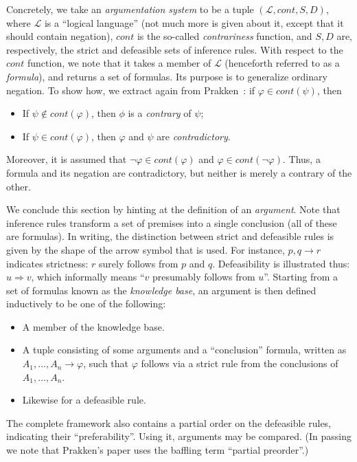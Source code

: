 \documentclass[12pt, a4paper]{article}
\begin{document}
Concretely, we take an \emph{argumentation system} to be a tuple \( (\mathcal{L}, \mathit{cont}, S, D) \), where $\mathcal{L}$ is a ``logical language'' (not much more is given about it, except that it should contain negation), $\mathit{cont}$ is the so-called \emph{contrariness} function, and $S, D$ are, respectively, the strict and defeasible sets of inference rules. With respect to the $cont$ function, we note that it takes a member of $\mathcal{L}$ (henceforth referred to as a \emph{formula}), and returns a set of formulas. Its purpose is to generalize ordinary negation. To show how, we extract again from Prakken~\cite[page 97]{prakken}: if \( \varphi \in \mathit{cont}(\psi) \), then
\begin{itemize}
\item If \( \psi \not\in \mathit{cont}(\varphi) \), then $\phi$ is a \emph{contrary} of $\psi$;
\item If \( \psi \in \mathit{cont}(\varphi) \), then $\varphi$ and $\psi$ are \emph{contradictory}.
\end{itemize}
Moreover, it is assumed that \( \neg\varphi \in \mathit{cont}(\varphi) \) and \( \varphi \in \mathit{cont}(\neg\varphi) \). Thus, a formula and its negation are contradictory, but neither is merely a contrary of the other.

We conclude this section by hinting at the definition of an \emph{argument}. Note that inference rules transform a set of premises into a single conclusion (all of these are formulas). In writing, the distinction between strict and defeasible rules is given by the shape of the arrow symbol that is used. For instance, \( p, q \rightarrow r \) indicates strictness: $r$ surely follows from $p$ and $q$. Defeasibility is illustrated thus: \( u \Rightarrow v \), which informally means ``$v$ presumably follows from $u$''. Starting from a set of formulas known as the \emph{knowledge base}, an argument is then defined inductively to be one of the following:
\begin{itemize}
\item A member of the knowledge base.
\item A tuple consisting of some arguments and a ``conclusion'' formula, written as \( A_{1},\ldots,A_{n} \rightarrow \varphi \), such that $\varphi$ follows via a strict rule from the conclusions of $A_{1},\ldots,A_{n}$.
\item Likewise for a defeasible rule.
\end{itemize}
The complete framework also contains a partial order on the defeasible rules, indicating their ``preferability''. Using it, arguments may be compared. (In passing we note that Prakken's paper uses the baffling term ``partial preorder''.)
\end{document}
